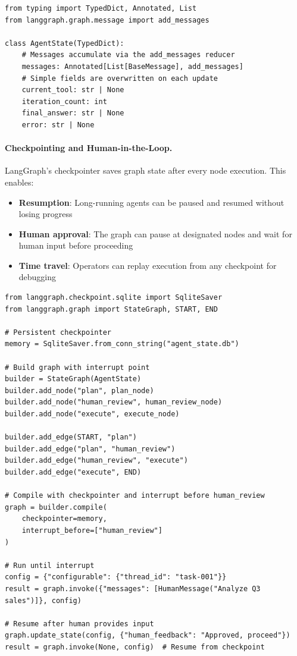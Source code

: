 \begin{lstlisting}[style=pythonstyle, caption={LangGraph state schema definition}]
from typing import TypedDict, Annotated, List
from langgraph.graph.message import add_messages

class AgentState(TypedDict):
    # Messages accumulate via the add_messages reducer
    messages: Annotated[List[BaseMessage], add_messages]
    # Simple fields are overwritten on each update
    current_tool: str | None
    iteration_count: int
    final_answer: str | None
    error: str | None
\end{lstlisting}

\paragraph{Checkpointing and Human-in-the-Loop.}
\label{checkpointing-and-human-in-the-loop.}

LangGraph’s checkpointer saves graph state after every node execution. This enables:

\begin{itemize}
  \item \textbf{Resumption}: Long-running agents can be paused and resumed without losing progress
  \item \textbf{Human approval}: The graph can pause at designated nodes and wait for human input before proceeding
  \item \textbf{Time travel}: Operators can replay execution from any checkpoint for debugging
\end{itemize}

\begin{lstlisting}[style=pythonstyle, caption={LangGraph checkpointing and human-in-the-loop}]
from langgraph.checkpoint.sqlite import SqliteSaver
from langgraph.graph import StateGraph, START, END

# Persistent checkpointer
memory = SqliteSaver.from_conn_string("agent_state.db")

# Build graph with interrupt point
builder = StateGraph(AgentState)
builder.add_node("plan", plan_node)
builder.add_node("human_review", human_review_node)
builder.add_node("execute", execute_node)

builder.add_edge(START, "plan")
builder.add_edge("plan", "human_review")
builder.add_edge("human_review", "execute")
builder.add_edge("execute", END)

# Compile with checkpointer and interrupt before human_review
graph = builder.compile(
    checkpointer=memory,
    interrupt_before=["human_review"]
)

# Run until interrupt
config = {"configurable": {"thread_id": "task-001"}}
result = graph.invoke({"messages": [HumanMessage("Analyze Q3 sales")]}, config)

# Resume after human provides input
graph.update_state(config, {"human_feedback": "Approved, proceed"})
result = graph.invoke(None, config)  # Resume from checkpoint
\end{lstlisting}

